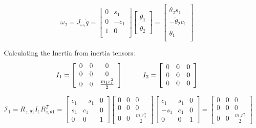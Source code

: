 \documentclass[12pt,norsk,a4paper]{article}
\begin{document}
    \[\omega_2 = J_{\omega_2}\dot q = 
    \left[\begin{array}{cc}
        0 & s_1\\
        0 & -c_1\\
        1 & 0\\
    \end{array}\right]
    \left[\begin{array}{c}
        \dot\theta_1 \\ \dot\theta_2
    \end{array}\right]
    = \left[\begin{array}{c}
        \dot\theta_2s_1\\
        -\dot\theta_2c_1\\
        \dot\theta_1\\
    \end{array}\right]\]

    Calculating the Inertia from inertia tensors:\\
    \[I_1 = \left[\begin{array}{ccc}
        0 & 0 & 0\\
        0 & 0 & 0\\
        0 & 0 & \frac{m_1r_1^2}{2}
    \end{array}\right] \hspace{10mm} I_2 = \left[\begin{array}{ccc}
        0 & 0 & 0\\
        0 & 0 & 0\\
        0 & 0 & 0
    \end{array}\right]\]

    \[\mathcal{I}_1 = R_{z,\theta1}I_1R_{z,\theta1}^T 
    = \left[\begin{array}{ccc}
        c_1 & -s_1 & 0\\
        s_1 & c_1 & 0\\
        0 & 0 & 1
    \end{array}\right]\left[\begin{array}{ccc}
        0 & 0 & 0\\
        0 & 0 & 0\\
        0 & 0 & \frac{m_1r_1^2}{2}
    \end{array}\right]\left[\begin{array}{ccc}
        c_1 & s_1 & 0\\
        -s_1 & c_1 & 0\\
        0 & 0 & 1
    \end{array}\right]
    = \left[\begin{array}{ccc}
        0 & 0 & 0\\
        0 & 0 & 0\\
        0 & 0 & \frac{m_1r_1^2}{2}
    \end{array}\right]\]
\end{document}
